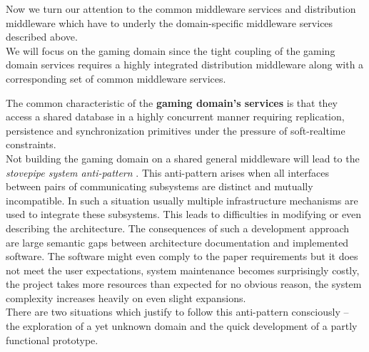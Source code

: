 \documentclass[a4paper, 10pt]{book}
\begin{document}
                Now we turn our attention to the common middleware services and
                distribution middleware which have to underly the domain-specific
                middleware services described above.\\
                We will focus on the gaming domain since the tight coupling of
                the gaming domain services requires a highly integrated distribution
                middleware along with a corresponding set of common middleware
                services. 
                \begin{description}
                    \item The common characteristic of the \textbf{gaming domain's services}
                        is that they access a shared database in a highly concurrent manner
                        requiring replication, persistence and synchronization primitives
                        under the pressure of soft-realtime constraints.\\
                        Not building the gaming domain on a shared general middleware will
                        lead to the \emph{stovepipe system anti-pattern} \cite{bmmm98}. This
                        anti-pattern arises when all interfaces between pairs of
                        communicating subsystems are distinct and mutually incompatible.
                        In such a situation usually multiple infrastructure mechanisms are
                        used to integrate these subsystems. This leads to difficulties in
                        modifying or even describing the architecture. The consequences of
                        such a development approach are large semantic gaps between
                        architecture documentation and implemented software. The software
                        might even comply to the paper requirements but it does not meet the
                        user expectations, system maintenance becomes surprisingly costly,
                        the project takes more resources than expected for no obvious
                        reason, the system complexity increases heavily on even
                        slight expansions.\\
                        There are two situations which justify to follow this anti-pattern
                        consciously -- the exploration of a yet unknown domain and the quick
                        development of a partly functional prototype.

\end{description}
\end{document}
